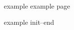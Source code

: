 \begin{theindex}
\item example \idxquad example page
\item example \idxquad init--end
\end{theindex}

